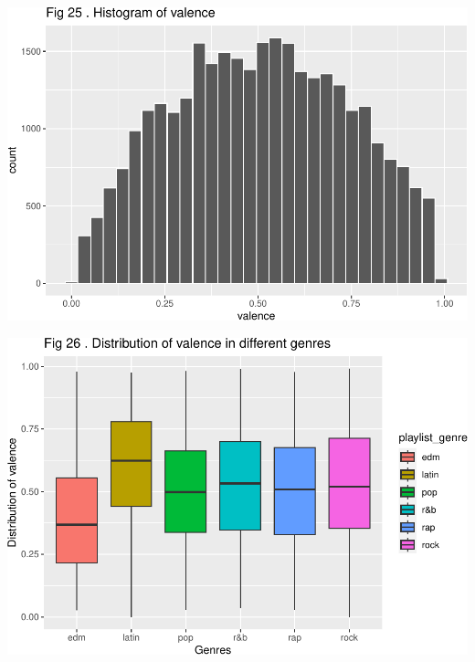 \documentclass[
]{article}
\begin{document}
\includegraphics{Final-Report_files/figure-latex/unnamed-chunk-14-21.pdf}

\includegraphics{Final-Report_files/figure-latex/unnamed-chunk-14-22.pdf}
\end{document}
